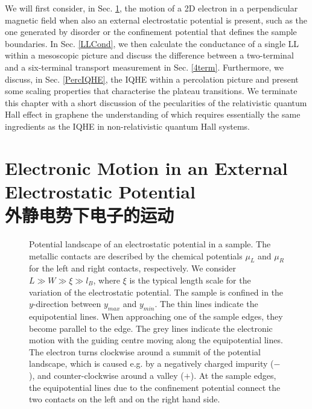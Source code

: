 \documentclass[10pt]{book}
\begin{document}
We will first consider, in Sec. \ref{ExtPot}, the motion of a 2D electron in a perpendicular magnetic field when also 
an external electrostatic potential is present, such as the one generated by disorder or the confinement potential that
defines the sample boundaries. In Sec. \ref{LLCond}, we then calculate the conductance of a single LL within a mesoscopic 
picture and discuss the difference between a two-terminal and a six-terminal transport measurement in Sec. \ref{4term}. 
Furthermore, we discuss, in Sec. \ref{PercIQHE}, the IQHE within a percolation picture and present some scaling properties 
that characterise the plateau transitions. We terminate this chapter with a short discussion of the pecularities of the
relativistic quantum Hall effect in graphene the understanding of which requires essentially the same ingredients as the IQHE in
non-relativistic quantum Hall systems.


\section[外静电势下电子的运动]{Electronic Motion in an External Electrostatic Potential\\\bf 外静电势下电子的运动}
\label{ExtPot}




\begin{figure}
\begin{center}
\end{center}
\caption{ Potential landscape of an electrostatic potential in a sample. The metallic contacts are  described by
the chemical potentials $\mu_L$ and $\mu_R$ for the left and right contacts, respectively. We consider $L\gg W \gg \xi \gg l_B$, where 
$\xi$ is the typical length scale for the variation of the electrostatic potential. The sample is confined in the $y$-direction
between $y_{max}$ and $y_{min}$. The thin lines indicate the equipotential lines. When approaching
one of the sample edges, they become parallel to the edge. 
The grey lines indicate the electronic motion with the guiding centre moving along the equipotential lines.
The electron turns clockwise around a summit of the potential landscape, which is caused e.g. by a negatively charged impurity ($-$),
and counter-clockwise around a valley ($+$). At the sample edges, the equipotential lines due to the confinement potential connect
the two contacts on the left and on the right hand side.}
\label{fig11}
\end{figure}
\end{document}
